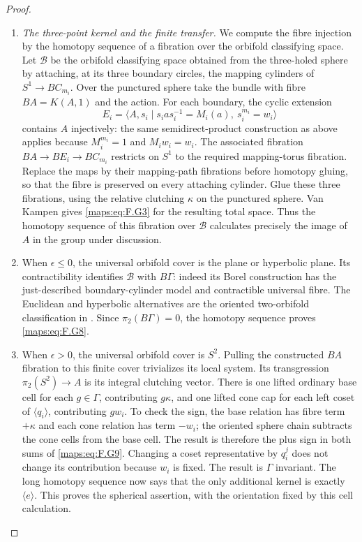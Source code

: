\documentclass[11pt,a4paper]{article}
\numberwithin{equation}{section}
\theoremstyle{definition}
\begin{document}
\begin{proof}
\begin{enumerate}[label=\arabic*.]
\item \emph{The three-point kernel and the finite transfer.}
We compute the fibre injection by the homotopy sequence of a
fibration over the orbifold classifying space.  Let $\mathcal B$ be the orbifold classifying
space obtained from the three-holed sphere by attaching, at
its three boundary circles, the mapping cylinders of
$S^1\to BC_{m_i}$.  Over the punctured sphere take the bundle
with fibre $BA=K(A,1)$ and the action.  For each
boundary, the cyclic extension
\[
 E_i=\langle A,s_i\mid s_i a s_i^{-1}=M_i(a),\ s_i^{m_i}=w_i\rangle
\]
contains $A$ injectively: the same semidirect-product construction
as above applies because $M_i^{m_i}=1$ and $M_iw_i=w_i$.
The associated fibration $BA\to BE_i\to BC_{m_i}$ restricts
on $S^1$ to the required mapping-torus fibration.  Replace the
maps by their mapping-path fibrations before homotopy gluing,
so that the fibre is preserved on every attaching cylinder.
Glue these three fibrations, using the relative clutching
$\kappa$ on the punctured sphere.  Van Kampen gives \eqref{maps:eq:F.G3}
for the resulting total space.  Thus the homotopy sequence
of this fibration over $\mathcal B$ calculates precisely
the image of $A$ in the group under discussion.

\item When $\epsilon\le0$, the universal orbifold cover is the plane
or hyperbolic plane.  Its contractibility identifies
$\mathcal B$ with $B\Gamma$: indeed its Borel construction
has the just-described boundary-cylinder model and contractible
universal fibre.  The Euclidean and hyperbolic alternatives
are the oriented two-orbifold classification in
\cite[Theorems 2.3--2.4, p.~425; Euler-characteristic comparison, pp.~427--428]{rootScott83}.
Since $\pi_2(B\Gamma)=0$, the homotopy sequence proves \eqref{maps:eq:F.G8}.

\item When $\epsilon>0$, the universal orbifold cover is $S^2$.
Pulling the constructed $BA$ fibration to this finite cover
trivializes its local system.  Its transgression
$\pi_2(S^2)\to A$ is its integral clutching vector.
There is one lifted ordinary base cell for each $g\in\Gamma$,
contributing $g\kappa$, and one lifted cone cap for each left
coset of $\langle q_i\rangle$, contributing $gw_i$.
To check the sign, the base relation has fibre term $+\kappa$
and each cone relation has term $-w_i$; the oriented sphere
chain subtracts the cone cells from the base cell.  The result
is therefore the plus sign in both sums of \eqref{maps:eq:F.G9}.
Changing a coset representative by $q_i^j$ does not change
its contribution because $w_i$ is fixed.  The result is
$\Gamma$ invariant. The long
homotopy sequence now says that the only additional kernel
is exactly $\langle e\rangle$.  This proves the spherical
assertion, with the orientation fixed by this cell calculation.


\end{enumerate}
\end{proof}
\end{document}
